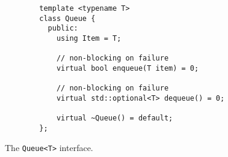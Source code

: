 \begin{figure}
    \begin{verbatim}
        template <typename T>
        class Queue {
          public:
            using Item = T;

            // non-blocking on failure
            virtual bool enqueue(T item) = 0;

            // non-blocking on failure
            virtual std::optional<T> dequeue() = 0;

            virtual ~Queue() = default;
        };
    \end{verbatim}
    \caption{The \texttt{Queue<T>} interface.}
    \label{fig:queue-interface}
\end{figure}
